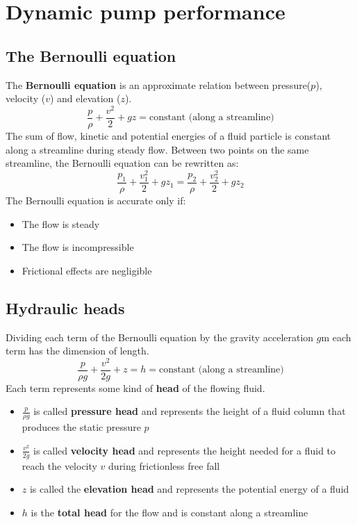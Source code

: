 \section{Dynamic pump performance}
\subsection{The Bernoulli equation}
The \textbf{Bernoulli equation} is an approximate relation between pressure($p$), velocity ($v$) and elevation ($z$).
\begin{equation}
  \frac{p}{\rho} + \frac{v^2}{2} + gz = \textrm{constant (along a streamline)}
\end{equation}
The sum of flow, kinetic and potential energies of a fluid particle is constant along a streamline during steady flow. Between two points on the same streamline, the Bernoulli equation can be rewritten as:
\begin{equation}
  \frac{p_1}{\rho} + \frac{v_1^2}{2}+ gz_1 = \frac{p_2}{\rho} + \frac{v_2^2}{2} + gz_2
\end{equation}
The Bernoulli equation is accurate only if:
\begin{itemize}
  \item The flow is steady
  \item The flow is incompressible
  \item Frictional effects are negligible
\end{itemize}
\subsection{Hydraulic heads}
Dividing each term of the Bernoulli equation by the gravity acceleration $g$m each term has the dimension of length.
\begin{equation}
  \frac{p}{\rho g} + \frac{v^2}{2g} +z = h = \textrm{constant (along a streamline)}
\end{equation}
Each term represents some kind of \textbf{head} of the flowing fluid.
\begin{itemize}
  \item $\frac{p}{\rho g}$ is called \textbf{pressure head} and represents the height of a fluid column that produces the static pressure $p$
  \item $\frac{v^2}{2g}$ is called \textbf{velocity head} and represents the height needed for a fluid to reach the velocity $v$ during frictionless free fall
  \item $z$ is called the \textbf{elevation head} and represents the potential energy of a fluid
  \item $h$ is the \textbf{total head} for the flow and is constant along a streamline
\end{itemize}
